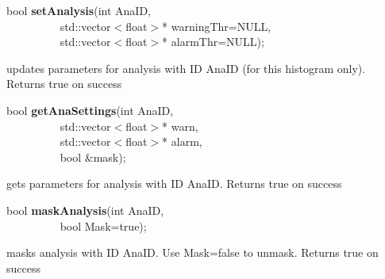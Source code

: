 \item    bool {\bf setAnalysis}(int AnaID,\\\mbox{}~~~~~~~~~ 
		   std::vector$<$float$>$* warningThr=NULL,\\\mbox{}~~~~~~~~~ 
		   std::vector$<$float$>$* alarmThr=NULL);

 updates parameters for analysis with ID AnaID (for this histogram only). Returns true on success


\item    bool {\bf getAnaSettings}(int AnaID,\\\mbox{}~~~~~~~~~
		      std::vector$<$float$>$* warn,\\\mbox{}~~~~~~~~~ 
		      std::vector$<$float$>$* alarm,\\\mbox{}~~~~~~~~~
		      bool \&mask);

 gets parameters for analysis with ID AnaID. Returns true on success


\item    bool {\bf maskAnalysis}(int AnaID,\\\mbox{}~~~~~~~~~
		    bool Mask=true);

 masks analysis with ID AnaID. Use Mask=false to unmask. Returns true on success


